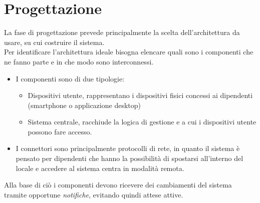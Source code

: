 \chapter{Progettazione}
La fase di progettazione prevede principalmente la scelta dell'architettura da usare, su cui costruire il sistema. 
\\Per identificare l'architettura ideale bisogna elencare quali sono i componenti che ne fanno parte e in che modo sono interconnessi.
\begin{itemize}
	\item I componenti sono di due tipologie:
		\begin{itemize}
			\item Dispositivi utente, rappresentano i dispositivi fisici concessi ai dipendenti (smartphone o applicazione desktop)
			\item Sistema centrale, racchiude la logica di gestione e a cui i dispositivi utente possono fare accesso.
		\end{itemize}
	\item I connettori sono principalmente protocolli di rete, in quanto il sistema è pensato per dipendenti che hanno la possibilità di spostarsi all'interno del locale e accedere al sistema centra in modalità remota.
\end{itemize}
Alla base di ciò i componenti devono ricevere dei cambiamenti del sistema tramite opportune \textit{notifiche}, evitando quindi attese attive.

